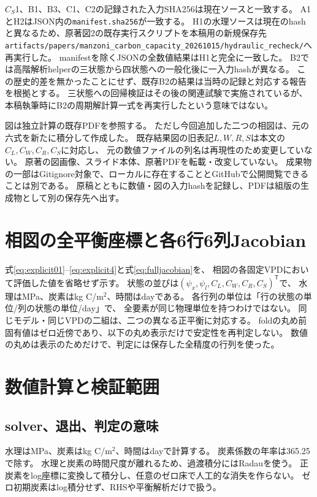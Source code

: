 \documentclass[a4paper,11pt]{ltjsarticle}
\newcommand{\tr}{^{\mathsf T}}
\newcommand{\code}[1]{\nolinkurl{#1}}
\begin{document}
$C_S$1、B1、B3、C1、C2の記録された入力SHA256は現在ソースと一致する。
A1とH2はJSON内の\code{manifest.sha256}が一致する。
H1の水理ソースは現在のhashと異なるため、原著図2の既存実行スクリプトを本稿用の新規保存先
\code{artifacts/papers/manzoni_carbon_capacity_20261015/hydraulic_recheck/}へ再実行した。
manifestを除くJSONの全数値結果はH1と完全に一致した。
B2では高階解析helperの三状態から四状態への一般化後に一入力hashが異なる。
この歴史的差を無かったことにせず、既存B2の結果は当時の記録と対応する報告を根拠とする。
三状態への回帰検証はその後の関連試験で実施されているが、
本稿執筆時にB2の周期解計算一式を再実行したという意味ではない。

図は独立計算の既存PDFを参照する。
ただし今回追加した二つの相図は、元の六式を新たに積分して作成した。
既存結果図の旧表記$L,W,R,S$は本文の$C_L,C_W,C_R,C_S$に対応し、
元の数値ファイルの列名は再現性のため変更していない。
原著の図画像、スライド本体、原著PDFを転載・改変していない。
成果物の一部はGitignore対象で、ローカルに存在することとGitHubで公開閲覧できることは別である。
原稿とともに数値・図の入力hashを記録し、PDFは組版の生成物として別の保存先へ出す。

\section{相図の全平衡座標と各6行6列Jacobian}\label{app:numericjacobians}
式\eqref{eq:explicit01}--\eqref{eq:explicit4}と式\eqref{eq:fulljacobian}を、
相図の各固定VPDにおいて評価した値を省略せず示す。
状態の並びは$(\psi_x,\psi_l,C_L,C_W,C_R,C_S)\tr$で、
水理はMPa、炭素はkg C/m$^2$、時間はdayである。
各行列の単位は「行の状態の単位/列の状態の単位/day」で、
全要素が同じ物理単位を持つわけではない。
同じモデル・同じVPDの二組は、二つの異なる正平衡に対応する。
foldの丸め前固有値はゼロ近傍であり、以下の丸め表示だけで安定性を再判定しない。
数値の丸めは表示のためだけで、判定には保存した全精度の行列を使った。
\begin{landscape}

\end{landscape}

\section{数値計算と検証範囲}
\subsection{solver、退出、判定の意味}
水理はMPa、炭素はkg C/m$^2$、時間はdayで計算する。
炭素係数の年率は365.25で除す。
水理と炭素の時間尺度が離れるため、過渡積分にはRadauを使う。
正炭素をlog座標に変換して積分し、任意のゼロ床で人工的な消失を作らない。
ゼロ初期炭素はlog積分せず、RHSや平衡解析だけで扱う。
\end{document}
